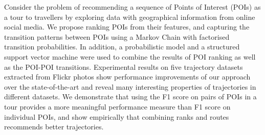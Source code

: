 Consider the problem of recommending a sequence of Points of Interest (POIs) as a tour
to travellers by exploring data with geographical information from online social media.
We propose ranking POIs from their features, and capturing the transition patterns between POIs
using a Markov Chain with factorised transition probabilities.
In addition, a probabilistic model and a structured support vector machine were used
to combine the results of POI ranking as well as the POI-POI transitions.
Experimental results on five trajectory datasets extracted from Flickr photos show performance
improvements of our approach over the state-of-the-art and reveal many interesting properties
of trajectories in different datasets.
We demonstrate that using the F1 score on pairs of POIs in a tour provides a more
meaningful performance measure than F1 score on individual POIs, and show empirically that
combining ranks and routes recommends better trajectories.
